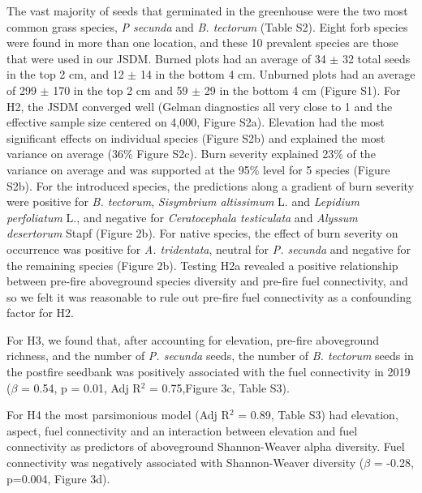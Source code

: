 \documentclass[
  12pt,
]{article}
\begin{document}
The vast majority of seeds that germinated in the greenhouse were the
two most common grass species, \emph{P secunda} and \emph{B. tectorum}
(Table S2). Eight forb species were found in more than one location, and
these 10 prevalent species are those that were used in our JSDM. Burned
plots had an average of 34 \(\pm\) 32 total seeds in the top 2 cm, and
12 \(\pm\) 14 in the bottom 4 cm. Unburned plots had an average of 299
\(\pm\) 170 in the top 2 cm and 59 \(\pm\) 29 in the bottom 4 cm (Figure
S1). For H2, the JSDM converged well (Gelman diagnostics all very close
to 1 and the effective sample size centered on 4,000, Figure S2a).
Elevation had the most significant effects on individual species (Figure
S2b) and explained the most variance on average (36\% Figure S2c). Burn
severity explained 23\% of the variance on average and was supported at
the 95\% level for 5 species (Figure S2b). For the introduced species,
the predictions along a gradient of burn severity were positive for
\emph{B. tectorum}, \emph{Sisymbrium altissimum} L. and \emph{Lepidium
perfoliatum} L., and negative for \emph{Ceratocephala testiculata} and
\emph{Alyssum desertorum} Stapf (Figure 2b). For native species, the
effect of burn severity on occurrence was positive for \emph{A.
tridentata}, neutral for \emph{P. secunda} and negative for the
remaining species (Figure 2b). Testing H2a revealed a positive
relationship between pre-fire aboveground species diversity and pre-fire
fuel connectivity, and so we felt it was reasonable to rule out pre-fire
fuel connectivity as a confounding factor for H2.

For H3, we found that, after accounting for elevation, pre-fire
aboveground richness, and the number of \emph{P. secunda} seeds, the
number of \emph{B. tectorum} seeds in the postfire seedbank was
positively associated with the fuel connectivity in 2019 (\(\beta\) =
0.54, p = 0.01, Adj R\(^2\) = 0.75,Figure 3c, Table S3).

For H4 the most parsimonious model (Adj R\(^2\) = 0.89, Table S3) had
elevation, aspect, fuel connectivity and an interaction between
elevation and fuel connectivity as predictors of aboveground
Shannon-Weaver alpha diversity. Fuel connectivity was negatively
associated with Shannon-Weaver diversity (\(\beta\) = -0.28, p=0.004,
Figure 3d).
\end{document}
